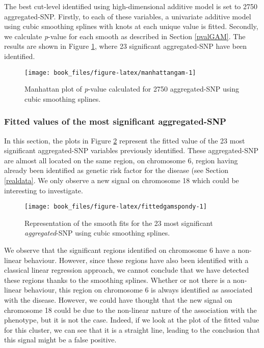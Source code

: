 \documentclass[]{book}
\begin{document}
The best cut-level identified using high-dimensional additive model is
set to 2750 aggregated-SNP. Firstly, to each of these variables, a
univariate additive model using cubic smoothing splines with knots at
each unique value is fitted. Secondly, we calculate \emph{p}-value for each
smooth as described in Section \ref{pvalGAM}. The results are shown
in Figure \ref{fig:manhattangam}, where 23 significant aggregated-SNP
have been identified.



\begin{figure}

{\centering \texttt{[image: book\_files/figure-latex/manhattangam-1]} 

}

\caption{Manhattan plot of \emph{p}-value calculated for 2750 aggregated-SNP using cubic smoothing splines.}\label{fig:manhattangam}
\end{figure}

\hypertarget{fitted-values-of-the-most-significant-aggregated-snp}{%
\subsubsection{Fitted values of the most significant aggregated-SNP}\label{fitted-values-of-the-most-significant-aggregated-snp}}

In this section, the plots in Figure \ref{fig:fittedgamspondy}
represent the fitted value of the 23 most significant aggregated-SNP
variables previously identified. These aggregated-SNP are almost all
located on the same region, on chromosome 6, region having already been
identified as genetic risk factor for the disease (see Section
\ref{realdata}. We only observe a new signal on chromosome 18
which could be interesting to investigate.



\begin{figure}

{\centering \texttt{[image: book\_files/figure-latex/fittedgamspondy-1]} 

}

\caption{Representation of the smooth fits for the 23 most significant \emph{aggregated}-SNP using cubic smoothing splines.}\label{fig:fittedgamspondy}
\end{figure}

We observe that the significant regions identified on chromosome 6 have
a non-linear behaviour. However, since these regions have also been
identified with a classical linear regression approach, we cannot
conclude that we have detected these regions thanks to the smoothing
splines. Whether or not there is a non-linear behaviour, this region on
chromosome 6 is always identified as associated with the disease.
However, we could have thought that the new signal on chromosome 18
could be due to the non-linear nature of the association with the
phenotype, but it is not the case. Indeed, if we look at the plot of the
fitted value for this cluster, we can see that it is a straight line,
leading to the conclusion that this signal might be a false positive.
\end{document}
